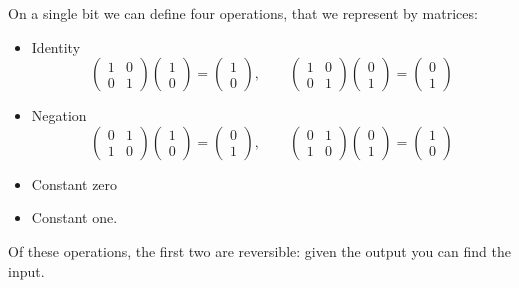 On a single bit we can define four operations, that we represent by
matrices:
\begin{itemize}
\item Identity
  \[ 
  \begin{pmatrix}
    1&0\\ 0&1
  \end{pmatrix}
  \begin{pmatrix}
    1\\0
  \end{pmatrix}
  =
  \begin{pmatrix}
    1\\0
  \end{pmatrix}
  ,\qquad
  \begin{pmatrix}
    1&0\\ 0&1
  \end{pmatrix}
  \begin{pmatrix}
    0\\1
  \end{pmatrix}
  =
  \begin{pmatrix}
    0\\1
  \end{pmatrix}
  \]
\item Negation
  \[ 
  \begin{pmatrix}
    0&1\\ 1&0
  \end{pmatrix}
  \begin{pmatrix}
    1\\0
  \end{pmatrix}
  =
  \begin{pmatrix}
    0\\1
  \end{pmatrix}
  ,\qquad
  \begin{pmatrix}
    0&1\\ 1&0
  \end{pmatrix}
  \begin{pmatrix}
    0\\1
  \end{pmatrix}
  =
  \begin{pmatrix}
    1\\0
  \end{pmatrix}
  \]
\item Constant zero
\item Constant one.
\end{itemize}

Of these operations, the first two are reversible: given the output
you can find the input.

